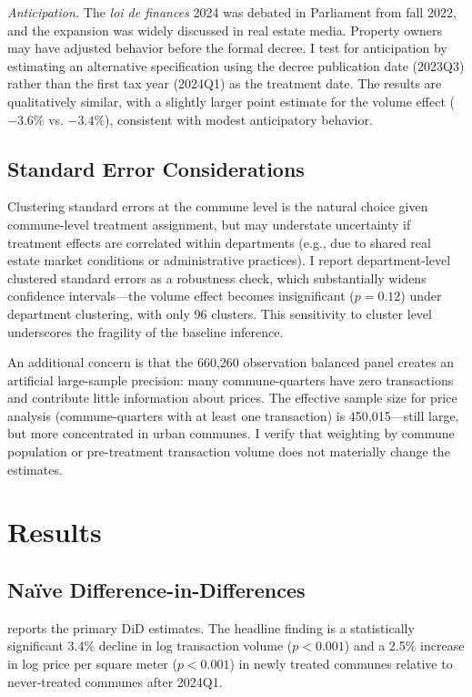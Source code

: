 \documentclass[12pt]{article}
\begin{document}
\textit{Anticipation.} The \textit{loi de finances} 2024 was debated in Parliament from fall 2022, and the expansion was widely discussed in real estate media. Property owners may have adjusted behavior before the formal decree. I test for anticipation by estimating an alternative specification using the decree publication date (2023Q3) rather than the first tax year (2024Q1) as the treatment date. The results are qualitatively similar, with a slightly larger point estimate for the volume effect ($-3.6\%$ vs. $-3.4\%$), consistent with modest anticipatory behavior.

\subsection{Standard Error Considerations}

Clustering standard errors at the commune level is the natural choice given commune-level treatment assignment, but may understate uncertainty if treatment effects are correlated within departments (e.g., due to shared real estate market conditions or administrative practices). I report department-level clustered standard errors as a robustness check, which substantially widens confidence intervals---the volume effect becomes insignificant ($p = 0.12$) under department clustering, with only 96 clusters. This sensitivity to cluster level underscores the fragility of the baseline inference.

An additional concern is that the 660,260 observation balanced panel creates an artificial large-sample precision: many commune-quarters have zero transactions and contribute little information about prices. The effective sample size for price analysis (commune-quarters with at least one transaction) is 450,015---still large, but more concentrated in urban communes. I verify that weighting by commune population or pre-treatment transaction volume does not materially change the estimates.


\section{Results}\label{sec:results}

\subsection{Na\"ive Difference-in-Differences}

 reports the primary DiD estimates. The headline finding is a statistically significant 3.4\% decline in log transaction volume ($p < 0.001$) and a 2.5\% increase in log price per square meter ($p < 0.001$) in newly treated communes relative to never-treated communes after 2024Q1.
\end{document}

